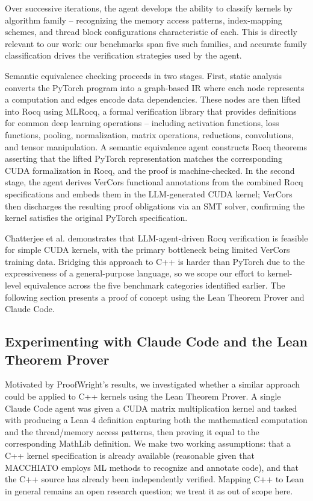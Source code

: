 \documentclass{article}
\begin{document}
Over successive iterations, the agent develops the ability to classify kernels by algorithm family -- recognizing the memory access patterns, index-mapping schemes, and thread block configurations characteristic of each. This is directly relevant to our work: our benchmarks span five such families, and accurate family classification drives the verification strategies used by the agent.

Semantic equivalence checking proceeds in two stages. First, static analysis converts the PyTorch program into a graph-based IR where each node represents a computation and edges encode data dependencies. These nodes are then lifted into Rocq using MLRocq, a formal verification library that provides definitions for common deep learning operations -- including activation functions, loss functions, pooling, normalization, matrix operations, reductions, convolutions, and tensor manipulation. A semantic equivalence agent constructs Rocq theorems asserting that the lifted PyTorch representation matches the corresponding CUDA formalization in Rocq, and the proof is machine-checked. In the second stage, the agent derives VerCors functional annotations from the combined Rocq specifications and embeds them in the LLM-generated CUDA kernel; VerCors then discharges the resulting proof obligations via an SMT solver, confirming the kernel satisfies the original PyTorch specification.

Chatterjee et al. demonstrates that LLM-agent-driven Rocq verification is feasible for simple CUDA kernels, with the primary bottleneck being limited VerCors training data. Bridging this approach to C++ is harder than PyTorch due to the expressiveness of a general-purpose language, so we scope our effort to kernel-level equivalence across the five benchmark categories identified earlier. The following section presents a proof of concept using the Lean Theorem Prover and Claude Code.

\subsection{Experimenting with Claude Code and the Lean Theorem Prover}

Motivated by ProofWright's results, we investigated whether a similar approach could be applied to C++ kernels using the Lean Theorem Prover. A single Claude Code agent was given a CUDA matrix multiplication kernel and tasked with producing a Lean 4 definition capturing both the mathematical computation and the thread/memory access patterns, then proving it equal to the corresponding MathLib definition. We make two working assumptions: that a C++ kernel specification is already available (reasonable given that MACCHIATO employs ML methods to recognize and annotate code), and that the C++ source has already been independently verified. Mapping C++ to Lean in general remains an open research question; we treat it as out of scope here.
\end{document}
